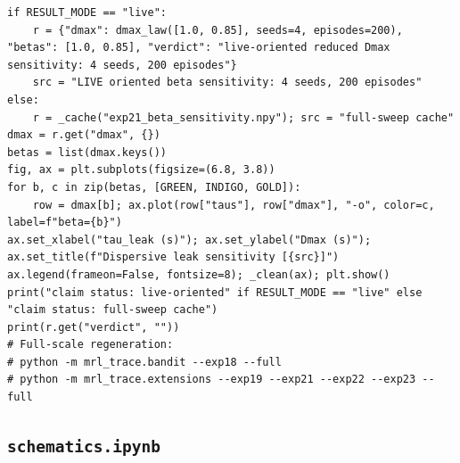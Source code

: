 \begin{lstlisting}[caption={06\_extensions.ipynb code cell 6},label={lst:mrl-nb-06-extensions-6}]
if RESULT_MODE == "live":
    r = {"dmax": dmax_law([1.0, 0.85], seeds=4, episodes=200), "betas": [1.0, 0.85], "verdict": "live-oriented reduced Dmax sensitivity: 4 seeds, 200 episodes"}
    src = "LIVE oriented beta sensitivity: 4 seeds, 200 episodes"
else:
    r = _cache("exp21_beta_sensitivity.npy"); src = "full-sweep cache"
dmax = r.get("dmax", {})
betas = list(dmax.keys())
fig, ax = plt.subplots(figsize=(6.8, 3.8))
for b, c in zip(betas, [GREEN, INDIGO, GOLD]):
    row = dmax[b]; ax.plot(row["taus"], row["dmax"], "-o", color=c, label=f"beta={b}")
ax.set_xlabel("tau_leak (s)"); ax.set_ylabel("Dmax (s)"); ax.set_title(f"Dispersive leak sensitivity [{src}]")
ax.legend(frameon=False, fontsize=8); _clean(ax); plt.show()
print("claim status: live-oriented" if RESULT_MODE == "live" else "claim status: full-sweep cache")
print(r.get("verdict", ""))
# Full-scale regeneration:
# python -m mrl_trace.bandit --exp18 --full
# python -m mrl_trace.extensions --exp19 --exp21 --exp22 --exp23 --full
\end{lstlisting}

\subsection{\texttt{schematics.ipynb}}


